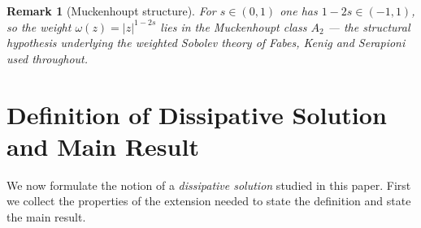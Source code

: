 \documentclass[12pt,a4paper,twoside]{article}
\newcommand{\Grad}{\nabla}
\newcommand{\dx}{{\,\rm d} {x}}
\newtheorem{rmk}{Remark}
\numberwithin{equation}{section}%
\newcommand{\Om}{\Omega}
\newcommand{\dz}{{\rm d} z}
\begin{document}
\begin{rmk}[Muckenhoupt structure]\label{rem:A2}
	For $s\in(0,1)$ one has $1-2s\in(-1,1)$, so the weight $\omega(z)=|z|^{1-2s}$ lies in the
	Muckenhoupt class $A_2$ --- the structural hypothesis underlying the weighted Sobolev theory of
	Fabes, Kenig and Serapioni \cite{FKS1982} used throughout.
\end{rmk}


	

	

\section{Definition of Dissipative Solution and Main Result}\label{sec:defn}

We now formulate the notion of a \emph{dissipative solution} studied in this paper. First we collect the properties of the extension needed to state the definition and state the main result.


	
\end{document}
